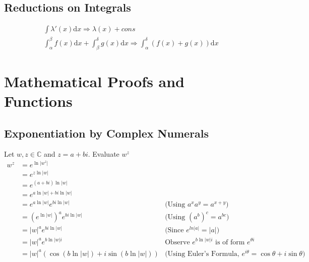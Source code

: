 \documentclass[11pt,a4paper]{book}
\begin{document}
\section{Reductions on Integrals}

\begin{eqnarray}
\int \lambda'(x) \text{d}x \Rightarrow \lambda(x) + cons \\
\int_{\alpha}^{\beta} f(x) \text{d}x + \int_{\beta}^{\delta} g(x) \text{d}x \Rightarrow \int_{\alpha}^{\delta} \left( f(x) + g(x) \right) \text{d}x  
\end{eqnarray}

\chapter{Mathematical Proofs and Functions}
\section{Exponentiation by Complex Numerals}
Let $w, z \in \mathbb{C}$ and $z = a + bi$. Evaluate $w^z$
\begin{align*}
w^z & = e^{\ln|w^z|} & \\
& = e^{z\ln|w|} & \\
& = e^{(a + bi)\ln|w|} & \\
& = e^{a\ln|w| + bi\ln|w|} & \\
& = e^{a\ln|w|}e^{bi\ln|w|} & \text{(Using $a^xa^y = a^{x+y}$)}\\
& = \left(e^{\ln|w|}\right)^a e^{bi\ln|w|}  & \text{(Using $\left(a^{b}\right)^c = a^{bc}$)}\\
& = |w|^ae^{bi\ln|w|} & \text{(Since $e^{ln|a|} = |a|$)} \\
& = |w|^ae^{b\ln|w|i} & \text{Observe $e^{b\ln|w|i}$ is of form $e^{\theta i}$}\\
& = |w|^a\left(\cos\left(b\ln|w|\right) + i \sin\left(b\ln|w|\right) \right) & \text{(Using Euler's Formula, $e^{i\theta} = \cos\theta + i\sin\theta$)}
\end{align*}





\end{document}
